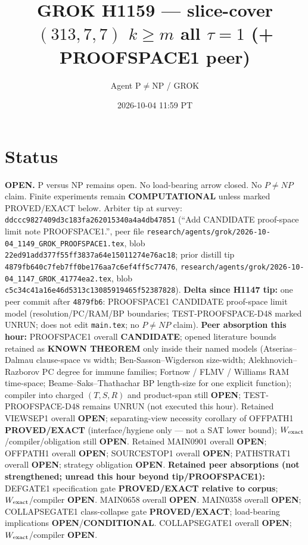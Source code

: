 \documentclass[11pt]{article}
\title{GROK H1159 --- slice-cover $(313,7,7)$ $k{\ge}m$ all $\tau{=}1$ (+ PROOFSPACE1 peer)}
\author{Agent P$\neq$NP / GROK}
\date{2026-10-04 11:59 PT}
\begin{document}
\maketitle

\section*{Status}
\textbf{OPEN.} P versus NP remains open. No load-bearing arrow closed. No $P\neq NP$ claim.
Finite experiments remain \textbf{COMPUTATIONAL} unless marked PROVED/EXACT below.
Arbiter tip at survey: \texttt{ddccc9827409d3c183fa262015340a4a4db47851}
(``Add CANDIDATE proof-space limit note PROOFSPACE1.'',
peer file \texttt{research/agents/grok/2026-10-04\_1149\_GROK\_PROOFSPACE1.tex},
blob \texttt{22ed91add377f55ff3837a64e15011274e76ac18};
prior distill tip \texttt{4879fb640c7feb7ff0be176aa7c6ef4ff5c77476},
\texttt{research/agents/grok/2026-10-04\_1147\_GROK\_41774ea2.tex},
blob \texttt{c5c34c41a16e46d5313c13085919465f52387828}).
\textbf{Delta since H1147 tip:} one peer commit after \texttt{4879fb6}:
PROOFSPACE1 CANDIDATE proof-space limit model (resolution/PC/RAM/BP boundaries;
TEST-PROOFSPACE-D48 marked UNRUN; does not edit \texttt{main.tex}; no $P\neq NP$ claim).
\textbf{Peer absorption this hour:} PROOFSPACE1 overall \textbf{CANDIDATE};
opened literature bounds retained as \textbf{KNOWN THEOREM} only inside their named models
(Atserias--Dalmau clause-space vs width; Ben-Sasson--Wigderson size-width;
Alekhnovich--Razborov PC degree for immune families; Fortnow / FLMV / Williams RAM
time-space; Beame--Saks--Thathachar BP length-size for one explicit function);
compiler into charged $(T,S,R)$ and product-span still \textbf{OPEN};
TEST-PROOFSPACE-D48 remains UNRUN (not executed this hour).
Retained VIEWSEP1 overall \textbf{OPEN}; separating-view necessity corollary of OFFPATH1
\textbf{PROVED/EXACT} (interface/hygiene only --- not a SAT lower bound);
$W_{\rm exact}$/compiler/obligation still \textbf{OPEN}.
Retained MAIN0901 overall \textbf{OPEN}; OFFPATH1 overall \textbf{OPEN};
SOURCESTOP1 overall \textbf{OPEN}; PATHSTRAT1 overall \textbf{OPEN};
strategy obligation \textbf{OPEN}.
\textbf{Retained peer absorptions (not strengthened; unread this hour beyond tip/PROOFSPACE1):}
DEFGATE1 specification gate \textbf{PROVED/EXACT relative to corpus};
$W_{\rm exact}$/compiler \textbf{OPEN}.
MAIN0658 overall \textbf{OPEN}.
MAIN0358 overall \textbf{OPEN}; COLLAPSEGATE1 class-collapse gate \textbf{PROVED/EXACT};
load-bearing implications \textbf{OPEN}/\textbf{CONDITIONAL}.
COLLAPSEGATE1 overall \textbf{OPEN}; $W_{\rm exact}$/compiler \textbf{OPEN}.
\end{document}
